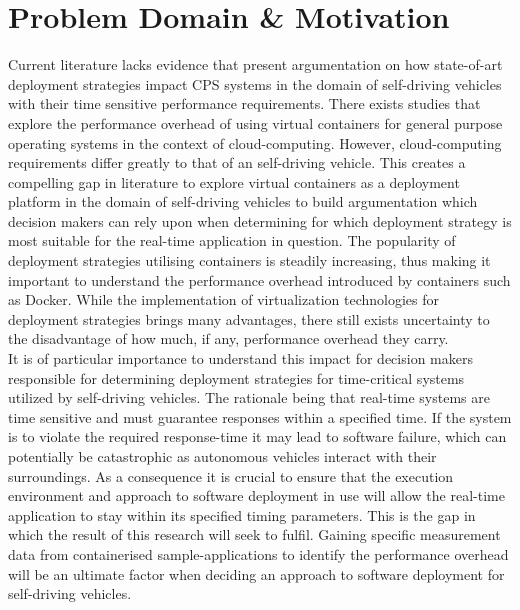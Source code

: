 
\section{Problem Domain \& Motivation}

Current literature lacks evidence that present argumentation on how state-of-art deployment strategies impact CPS systems in the domain of self-driving vehicles with their time sensitive performance requirements. There exists studies that explore the performance overhead of using virtual containers for general purpose operating systems in the context of cloud-computing. However, cloud-computing requirements differ greatly to that of an self-driving vehicle. This creates a compelling gap in literature to explore virtual containers as a deployment platform in the domain of self-driving vehicles to build argumentation which decision makers can rely upon when determining for which deployment strategy is most suitable for the real-time application in question. The popularity of deployment strategies utilising containers is steadily increasing, thus making it important to understand the performance overhead introduced by containers such as Docker. While the implementation of virtualization technologies for deployment strategies brings many advantages, there still exists uncertainty to the disadvantage of how much, if any, performance overhead they carry.\\

It is of particular importance to understand this impact for decision makers responsible for determining deployment strategies for time-critical systems utilized by self-driving vehicles. The rationale being that real-time systems are time sensitive and must guarantee responses within a specified time. If the system is to violate the required response-time it may lead to software failure, which can potentially be catastrophic as autonomous vehicles interact with their surroundings. As a consequence it is crucial to ensure that the execution environment and approach to software deployment in use will allow the real-time application to stay within its specified timing parameters. This is the gap in which the result of this research will seek to fulfil. Gaining specific measurement data from containerised sample-applications to identify the performance overhead will be an ultimate factor when deciding an approach to software deployment for self-driving vehicles.

